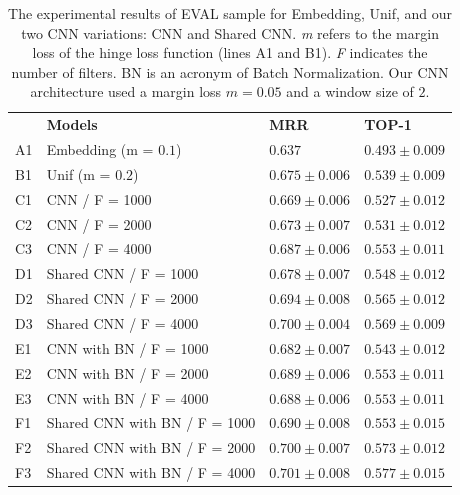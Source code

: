 \documentclass[sigconf]{acmart}
\begin{document}
\begin{table}[t]
\centering
\begin{tabular}{ p{1cm} p{6cm} >{\raggedleft\arraybackslash}p{4cm} >{\raggedleft\arraybackslash}p{4cm} }
 \hline
    & & \multicolumn{2}{c}{\textbf{Results}}\\
 \hline
 & \textbf{Models} & \textbf{MRR} & \textbf{TOP-1}\\
 \hline
 A1 & Embedding (m = $0.1$) & $0.637$& $0.493 \pm 0.009$\\
 
 \hline
 
 B1 & Unif (m = $0.2$) & $0.675 \pm 0.006$ & $0.539 \pm 0.009$\\
 
 \hline
 
 C1 & CNN / F = 1000 & $0.669 \pm 0.006$ & $0.527 \pm 0.012$\\
 
 C2 & CNN / F = 2000 & $0.673 \pm 0.007$ & $0.531 \pm 0.012$\\
 
 C3 & CNN / F = 4000 & $0.687 \pm 0.006$ & $0.553 \pm 0.011$\\
 
 \hline
 
 D1 & Shared CNN / F = 1000 & $0.678 \pm 0.007$ & $0.548 \pm 0.012$\\
 
 D2 & Shared CNN / F = 2000 & $0.694 \pm 0.008$ & $0.565 \pm 0.012$\\
 
 D3 & Shared CNN / F = 4000 & $0.700 \pm 0.004$ & $0.569 \pm 0.009$\\
 
 \hline
 
 E1 & CNN with BN / F = 1000 & $0.682 \pm 0.007$ & $0.543 \pm 0.012$\\
 
 E2 & CNN with BN / F = 2000 & $0.689 \pm 0.006$ & $0.553 \pm 0.011$\\
 
 E3 & CNN with BN / F = 4000 & $0.688 \pm 0.006$ & $0.553 \pm 0.011$\\
 
 \hline
 
 F1 & Shared CNN with BN / F = 1000 & $0.690 \pm 0.008$ & $0.553 \pm 0.015$\\
 
 F2 & Shared CNN with BN / F = 2000 & $0.700 \pm 0.007$ & $0.573 \pm 0.012$\\
 
 F3 & Shared CNN with BN / F = 4000 & $0.701 \pm 0.008$ & $0.577 \pm 0.015$\\
 
\hline
\end{tabular}
\caption{The experimental results of EVAL sample for Embedding, Unif, and our two CNN variations: CNN and Shared CNN. \emph{m} refers to the margin loss of the hinge loss function (lines A1 and B1). \emph{F} indicates the number of filters. BN is an acronym of Batch Normalization. Our CNN architecture used a margin loss $m = 0.05$ and a window size of $2$.}
\label{table:resultados}
\end{table}
\end{document}
